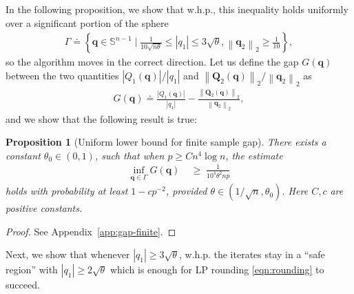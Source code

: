 \documentclass[11pt, journal, final]{IEEEtran}
\numberwithin{equation}{section}
\newtheorem{proposition}[theorem]{Proposition}
\newcommand{\mb}{\mathbf}
\newcommand{\bb}{\mathbb}
\newcommand{\norm}[1]{\left\lVert#1\right\rVert}
\newcommand{ \abs }[1]{\left| #1 \right|}
\newcommand{ \Brac }[1]{\left\lbrace #1 \right\rbrace}
\newcommand{ \paren }[1]{ \left( #1 \right) }
\begin{document}
{\begin{equation*}
\end{equation*}
In the following proposition, we show that w.h.p., this inequality holds uniformly over a significant portion of the sphere
\begin{align}\label{eqn:Gamma-set}
	\Gamma \doteq \Brac{\mb q\in \bb S^{n-1} \mid \frac{1}{10\sqrt{n \theta}} \le \abs{q_1} \le 3\sqrt{\theta}, \norm{\mb q_2}_2 \geq \frac{1}{10}},
\end{align}
so the algorithm moves in the correct direction. Let us define the gap $G(\mb q)$ between the two quantities $\abs{Q_1(\mb q)}/\abs{q_1}$ and $\norm{\mb Q_2(\mb q)}_2/ \norm{\mb q_2}_2$ as
\begin{align}\label{eqn:gap-G}
	G(\mb q) \doteq \frac{\abs{Q_1(\mb q)}}{\abs{q_1}} - \frac{\norm{\mb Q_2(\mb q) }_2}{\norm{\mb q_2}_2},
\end{align}
and we show that the following result is true:

\begin{proposition}[Uniform lower bound for finite sample gap]\label{prop:gap-bound-Y'}
There exists a constant $\theta_0 \in (0, 1)$, such that when $p \ge Cn^4 \log n$, the estimate
\begin{align*}
\inf_{\mb q \in \Gamma} G(\mb q) \;&\geq \;\frac{1}{10^4\theta^2 np }
\end{align*}
holds with probability at least $1 -cp^{-2}$, provided $\theta\in \paren{1/\sqrt{n},\theta_0}$. Here $C, c$ are positive constants.
\end{proposition}
\begin{proof}
	See Appendix~\ref{app:gap-finite}.
\end{proof}

Next, we show that whenever $\abs{q_1}\geq 3\sqrt{\theta}$, w.h.p. the iterates stay in a ``safe region'' with $\abs{q_1}\geq 2\sqrt{\theta}$ which is enough for LP rounding \eqref{eqn:rounding} to succeed.

}
\end{document}

